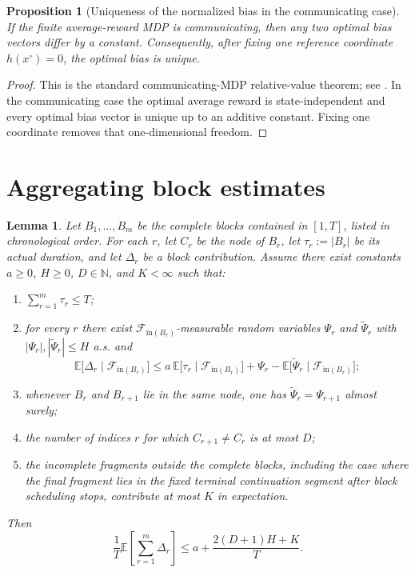 \documentclass[12pt]{article}
\newtheorem{proposition}[theorem]{Proposition}
\newtheorem{lemma}[theorem]{Lemma}
\theoremstyle{definition}
\newcommand{\N}{\mathbb{N}}
\newcommand{\E}{\mathbb{E}}
\newcommand{\1}{\mathbf{1}}
\newcommand{\cF}{\mathcal{F}}
\begin{document}
\begin{proposition}[Uniqueness of the normalized bias in the communicating case]
\label{prop:bias-unique}
If the finite average-reward MDP is communicating, then any two optimal bias
vectors differ by a constant. Consequently, after fixing one reference coordinate
$h(x^\circ)=0$, the optimal bias is unique.
\end{proposition}

\begin{proof}
This is the standard communicating-MDP relative-value theorem; see
\cite[Chapter~8]{Puterman1994}. In the communicating case the optimal average
reward is state-independent and every optimal bias vector is unique up to an
additive constant. Fixing one coordinate removes that one-dimensional freedom.
\end{proof}


\section{Aggregating block estimates}
\label{app:aggregation}

\begin{lemma}
\label{lem:aggregation}
Let $B_1,\dots,B_m$ be the complete blocks contained in $[1,T]$, listed in
chronological order. For each $r$, let $C_r$ be the node of $B_r$, let
$\tau_r:=|B_r|$ be its actual duration, and let $\Delta_r$ be a block contribution.
Assume there exist constants $a\ge 0$, $H\ge 0$, $D\in\N$, and $K<\infty$ such that:
\begin{enumerate}[label=\textnormal{(\roman*)},leftmargin=2.6em]
\item $\sum_{r=1}^m \tau_r\le T$;
\item for every $r$ there exist $\cF_{\mathrm{in}(B_r)}$-measurable random variables
$\Psi_r$ and $\widetilde\Psi_r$ with $|\Psi_r|,|\widetilde\Psi_r|\le H$ a.s. and
\[
\E\bigl[\Delta_r\mid \cF_{\mathrm{in}(B_r)}\bigr]
\le
a\,\E\bigl[\tau_r\mid \cF_{\mathrm{in}(B_r)}\bigr]
+
\Psi_r-\E\bigl[\widetilde\Psi_r\mid \cF_{\mathrm{in}(B_r)}\bigr];
\]
\item whenever $B_r$ and $B_{r+1}$ lie in the same node, one has
$\widetilde\Psi_r=\Psi_{r+1}$ almost surely;
\item the number of indices $r$ for which $C_{r+1}\neq C_r$ is at most $D$;
\item the incomplete fragments outside the complete blocks, including the case
where the final fragment lies in the fixed terminal continuation segment after
block scheduling stops, contribute at most $K$ in expectation.
\end{enumerate}
Then
\[
\frac1T\E\left[\sum_{r=1}^m \Delta_r\right]
\le a + \frac{2(D+1)H+K}{T}.
\]
\end{lemma}
\end{document}
